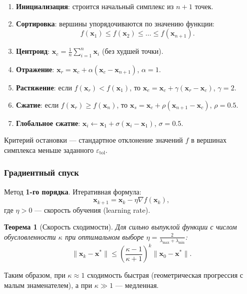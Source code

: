 \documentclass[a4paper, 14pt]{extarticle}
\newtheorem{theorem}{Теорема}
\begin{document}
\begin{enumerate}
    \item \textbf{Инициализация}: строится начальный симплекс из $n+1$ точек.
    \item \textbf{Сортировка}: вершины упорядочиваются по значению функции:
    \[
        f(\mathbf{x}_1) \le f(\mathbf{x}_2) \le \ldots \le f(\mathbf{x}_{n+1}).
    \]
    \item \textbf{Центроид}: $\mathbf{x}_c = \frac{1}{n}\sum_{i=1}^{n} \mathbf{x}_i$ (без худшей точки).
    \item \textbf{Отражение}: $\mathbf{x}_r = \mathbf{x}_c + \alpha(\mathbf{x}_c - \mathbf{x}_{n+1})$, $\alpha = 1$.
    \item \textbf{Растяжение}: если $f(\mathbf{x}_r) < f(\mathbf{x}_1)$, то $\mathbf{x}_e = \mathbf{x}_c + \gamma(\mathbf{x}_r - \mathbf{x}_c)$, $\gamma = 2$.
    \item \textbf{Сжатие}: если $f(\mathbf{x}_r) \ge f(\mathbf{x}_n)$, то $\mathbf{x}_s = \mathbf{x}_c + \rho(\mathbf{x}_{n+1} - \mathbf{x}_c)$, $\rho = 0.5$.
    \item \textbf{Глобальное сжатие}: $\mathbf{x}_i \leftarrow \mathbf{x}_1 + \sigma(\mathbf{x}_i - \mathbf{x}_1)$, $\sigma = 0.5$.
\end{enumerate}

Критерий остановки --- стандартное отклонение значений $f$ в вершинах симплекса меньше заданного $\varepsilon_{\mathrm{tol}}$.

\subsubsection{Градиентный спуск}

Метод \textbf{1-го порядка}. Итеративная формула:
\begin{equation}\label{eq:gd}
    \mathbf{x}_{k+1} = \mathbf{x}_k - \eta \nabla f(\mathbf{x}_k),
\end{equation}
где $\eta > 0$ --- скорость обучения (learning rate).

\begin{theorem}[Скорость сходимости]
Для сильно выпуклой функции с числом обусловленности $\kappa$ при оптимальном выборе $\eta = \frac{2}{\lambda_{\max} + \lambda_{\min}}$:
\[
    \|\mathbf{x}_k - \mathbf{x}^*\| \le \left(\frac{\kappa - 1}{\kappa + 1}\right)^k \|\mathbf{x}_0 - \mathbf{x}^*\|.
\]
\end{theorem}

Таким образом, при $\kappa \approx 1$ сходимость быстрая (геометрическая прогрессия с малым знаменателем), а при $\kappa \gg 1$ --- медленная.
\end{document}
